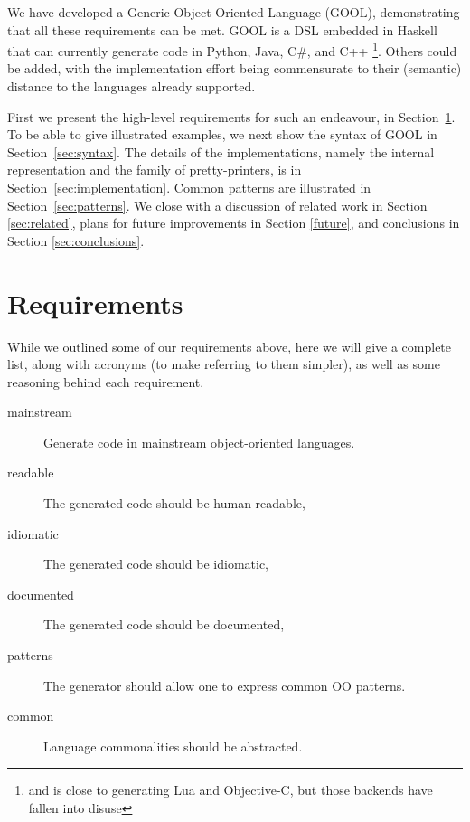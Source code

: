 \documentclass[sigplan,review,anonymous,prologue,dvipsnames]{acmart}
\begin{document}
We have developed a Generic Object-Oriented Language (GOOL), demonstrating
that all these requirements can be met.  GOOL is a DSL embedded in Haskell that
can currently generate code in Python, Java, C\#, and C++%
\footnote{and is close to generating Lua and Objective-C, but those backends
have fallen into disuse}. Others could be added, with the implementation
effort being commensurate to their (semantic) distance to the languages
already supported.

First we present the high-level requirements for such an endeavour, in
Section~\ref{sec:req}.  To be able to give illustrated examples, we
next show the syntax of GOOL in Section~\ref{sec:syntax}. The details of
the implementations, namely the internal representation and the
family of pretty-printers, is in Section~\ref{sec:implementation}.
Common patterns are illustrated in Section~\ref{sec:patterns}.  We 
close with a discussion of related work in Section \ref{sec:related}, plans for 
future improvements in Section \ref{future}, and conclusions in Section 
\ref{sec:conclusions}.

\section{Requirements} \label{sec:req}

While we outlined some of our requirements above, here we will give a 
complete list, along with acronyms (to make referring to them simpler),
as well as some reasoning behind each requirement.

\newcommand{\abbrev}[1]{\textbf{#1}}
\newcommand{\mainstream}{\abbrev{mainstream}}
\newcommand{\readable}{\abbrev{readable}}
\newcommand{\idiomatic}{\abbrev{idiomatic}}
\newcommand{\documented}{\abbrev{documented}}
\newcommand{\oopatterns}{\abbrev{patterns}}
\newcommand{\common}{\abbrev{common}}

\begin{description}
\item[mainstream] Generate code in mainstream object-oriented languages.
\item[readable] The generated code should be human-readable,
\item[idiomatic] The generated code should be idiomatic,
\item[documented] The generated code should be documented,
\item[patterns] The generator should allow one to express common OO patterns.
\item[common] Language commonalities should be abstracted.
\end{description}
\end{document}
